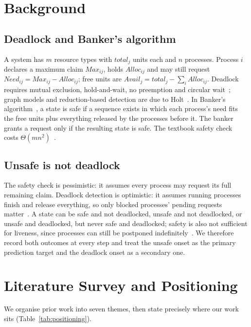 \documentclass[conference]{IEEEtran}
\begin{document}
\section{Background}
\subsection{Deadlock and Banker's algorithm}
A system has $m$ resource types with $\mathit{total}_j$ units each and $n$ processes. Process $i$ declares a maximum claim $\mathit{Max}_{ij}$, holds $\mathit{Alloc}_{ij}$ and may still request $\mathit{Need}_{ij}=\mathit{Max}_{ij}-\mathit{Alloc}_{ij}$; free units are $\mathit{Avail}_j=\mathit{total}_j-\sum_i\mathit{Alloc}_{ij}$. Deadlock requires mutual exclusion, hold-and-wait, no preemption and circular wait~\cite{Coffman1971}; graph models and reduction-based detection are due to Holt~\cite{Holt1972}. In Banker's algorithm~\cite{Dijkstra-EWD623,Habermann1969}, a state is safe if a sequence exists in which each process's need fits the free units plus everything released by the processes before it. The banker grants a request only if the resulting state is safe. The textbook safety check~\cite{Silberschatz2018,Tanenbaum2022} costs $\Theta(mn^2)$~\cite{Belik1987}.

\subsection{Unsafe is not deadlock}
The safety check is pessimistic: it assumes every process may request its full remaining claim. Deadlock detection is optimistic: it assumes running processes finish and release everything, so only blocked processes' pending requests matter~\cite{Holt1972,Silberschatz2018}. A state can be safe and not deadlocked, unsafe and not deadlocked, or unsafe and deadlocked, but never safe and deadlocked; safety is also not sufficient for liveness, since processes can still be postponed indefinitely~\cite{Holt1971,ParnasHabermann1972}. We therefore record both outcomes at every step and treat the unsafe onset as the primary prediction target and the deadlock onset as a secondary one.

\section{Literature Survey and Positioning}
We organise prior work into seven themes, then state precisely where our work sits (Table~\ref{tab:positioning}).
\end{document}
